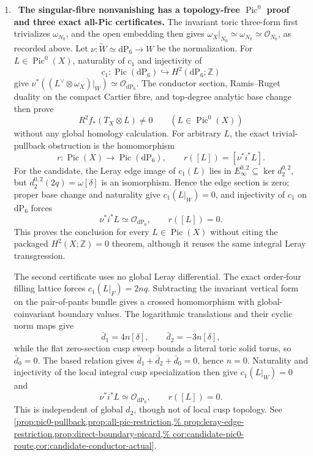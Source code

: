 \begin{enumerate}[leftmargin=1.8em,itemsep=.65em]
\item \Verified\ \textbf{The singular-fibre nonvanishing has a
topology-free $\operatorname{Pic}^0$ proof and three exact all-Pic
certificates.}
The invariant toric three-form first trivializes $\omega_{N_0}$, and the
open embedding then gives
$\omega_X|_{N_0}\simeq\omega_{N_0}\simeq\mathcal O_{N_0}$, as recorded
above.  Let
$\nu:\widetilde W\simeq\mathrm{dP}_6\to W$ be the normalization.  For
$L\in\operatorname{Pic}^0(X)$, naturality of $c_1$ and injectivity of
\[
 c_1:\operatorname{Pic}(\mathrm{dP}_6)\hookrightarrow
 H^2(\mathrm{dP}_6;\mathbb Z)
\]
give
$\nu^*((L^\vee\otimes\omega_X)|_W)\simeq\mathcal O_{\mathrm{dP}_6}$.
The conductor section, Ramis--Ruget duality on the compact Cartier fibre,
and top-degree analytic base change then prove
\[
 R^2f_*(T_X\otimes L)\ne0
 \qquad(L\in\operatorname{Pic}^0(X))
\]
without any global homology calculation.  For arbitrary $L$, the exact
trivial-pullback obstruction is the homomorphism
\[
 r:\operatorname{Pic}(X)\longrightarrow\operatorname{Pic}(\mathrm{dP}_6),
 \qquad r([L])=[\nu^*i^*L].
\]
For the candidate, the Leray edge image of $c_1(L)$ lies in
$E_\infty^{0,2}\subseteq\ker d_2^{0,2}$, but
$d_2^{0,2}(2q)=\omega[\delta]$ is an isomorphism.  Hence the edge section is
zero; proper base change and naturality give $c_1(L|_W)=0$, and injectivity
of $c_1$ on $\mathrm{dP}_6$ forces
\[
 \nu^*i^*L\simeq\mathcal O_{\mathrm{dP}_6},
 \qquad r([L])=0.
\]
This proves the conclusion for
every $L\in\operatorname{Pic}(X)$ without citing the packaged
$H^2(X;\mathbb Z)=0$ theorem, although it reuses the same integral Leray
transgression.

The second certificate uses no global Leray differential.  The exact
order-four filling lattice forces $c_1(L|_F)=2nq$.  Subtracting the invariant
vertical form on the pair-of-pants bundle gives a crossed homomorphism with
global-coinvariant boundary values.  The logarithmic translations and their
cyclic norm maps give
\[
 \bar d_1=4n[\delta],\qquad \bar d_2=-3n[\delta],
\]
while the flat zero-section cusp sweep bounds a literal toric solid torus,
so $\bar d_0=0$.  The based relation gives
$\bar d_1+\bar d_2+\bar d_0=0$, hence $n=0$.  Naturality and injectivity of
the local integral cusp specialization then give $c_1(L|_W)=0$ and
\[
 \nu^*i^*L\simeq\mathcal O_{\mathrm{dP}_6},
 \qquad r([L])=0.
\]
This is independent of global $d_2$, though not of local cusp
topology.  See
\cref{prop:pic0-pullback,prop:all-pic-restriction,%
prop:leray-edge-restriction,prop:direct-boundary-picard,%
cor:candidate-pic0-route,cor:candidate-conductor-actual}.


\end{enumerate}
